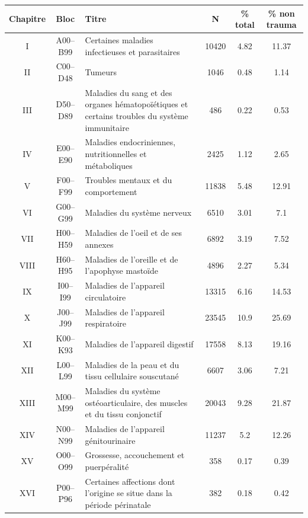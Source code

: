\documentclass[12pt,english,french,twoside]{report}\usepackage[]{graphicx}\usepackage[]{color}
\begin{document}
\begin{longtable}{|c|c|m{4cm}|c|c|c|}
 \hline
 Chapitre & Bloc & Titre & N & \% total  & \% non trauma \\
 \hline
 
I & A00–B99 & Certaines maladies infectieuses et parasitaires & 10420 & 4.82 & 11.37 \\
 II&C00–D48&Tumeurs&1046&0.48&1.14\\
 
III&D50–D89&Maladies du sang et des organes hématopoïétiques et certains troubles du système immunitaire&486&0.22&0.53\\

IV&E00–E90&Maladies endocriniennes, nutritionnelles et métaboliques&2425&1.12&2.65\\

V&F00–F99&Troubles mentaux et du comportement&11838&5.48&12.91\\

VI&G00–G99&Maladies du système nerveux&6510&3.01&7.1\\

VII & H00–H59 & Maladies de l'oeil et de ses annexes & 6892 & 3.19&7.52\\

VIII&H60–H95&Maladies de l'oreille et de l'apophyse mastoïde&4896&2.27&5.34\\

IX&I00–I99&Maladies de l'appareil circulatoire&13315&6.16&14.53\\

X&J00–J99&Maladies de l'appareil respiratoire&23545&10.9&25.69\\

XI&K00–K93&Maladies de l'appareil digestif&17558&8.13&19.16\\

XII&L00–L99&Maladies de la peau et du tissu cellulaire souscutané&6607&3.06&7.21\\

XIII&M00–M99&Maladies du système ostéoarticulaire, des muscles et du tissu conjonctif&20043&9.28&21.87\\

XIV&N00–N99&Maladies de l'appareil génitourinaire&11237&5.2&12.26\\

XV&O00–O99&Grossesse, accouchement et puerpéralité&358&0.17&0.39\\

XVI&P00–P96&Certaines affections dont l'origine se situe dans la période périnatale&382&0.18&0.42\\


\end{longtable}
\end{document}
